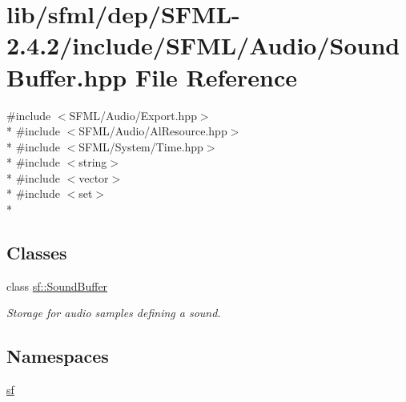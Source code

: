 \hypertarget{sfml_2dep_2_s_f_m_l-2_84_82_2include_2_s_f_m_l_2_audio_2_sound_buffer_8hpp}{\section{lib/sfml/dep/\-S\-F\-M\-L-\/2.4.2/include/\-S\-F\-M\-L/\-Audio/\-Sound\-Buffer.hpp File Reference}
\label{sfml_2dep_2_s_f_m_l-2_84_82_2include_2_s_f_m_l_2_audio_2_sound_buffer_8hpp}
}
{\ttfamily \#include $<$S\-F\-M\-L/\-Audio/\-Export.\-hpp$>$}\\*
{\ttfamily \#include $<$S\-F\-M\-L/\-Audio/\-Al\-Resource.\-hpp$>$}\\*
{\ttfamily \#include $<$S\-F\-M\-L/\-System/\-Time.\-hpp$>$}\\*
{\ttfamily \#include $<$string$>$}\\*
{\ttfamily \#include $<$vector$>$}\\*
{\ttfamily \#include $<$set$>$}\\*
\subsection*{Classes}
\begin{DoxyCompactItemize}
\item 
class \hyperlink{classsf_1_1_sound_buffer}{sf\-::\-Sound\-Buffer}
\begin{DoxyCompactList}\small\item\em Storage for audio samples defining a sound. \end{DoxyCompactList}\end{DoxyCompactItemize}
\subsection*{Namespaces}
\begin{DoxyCompactItemize}
\item 
\hyperlink{namespacesf}{sf}
\end{DoxyCompactItemize}
